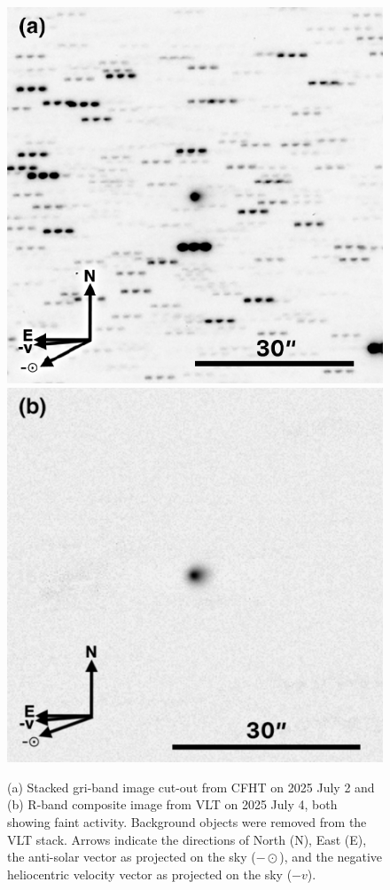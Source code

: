 \documentclass[linenumbers,twocolumn,longbib]{aastex7}
\begin{document}
\begin{figure}
    \includegraphics[width=1.\linewidth]{static/3I_cfht_invert_annotated.pdf}
    \includegraphics[width=1.\linewidth]{static/3I_VLT_Jul4_annotated.pdf}
\caption{(a) Stacked gri-band image cut-out from CFHT on 2025 July 2 and (b) R-band composite image from VLT on 2025 July 4, both showing faint activity. Background objects were removed from the VLT stack.  Arrows indicate the directions of North (N), East (E), the anti-solar vector as projected on the sky ($-\odot$), and the negative heliocentric velocity vector as projected on the sky ($-v$).}
\label{fig:cfht_vlt}
\end{figure}
\end{document}
